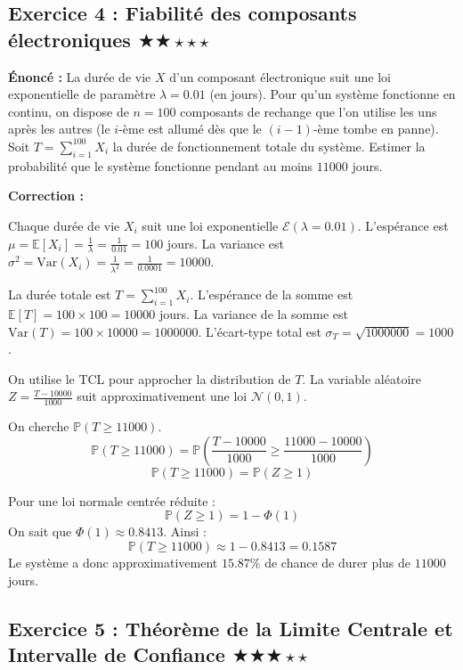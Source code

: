 \documentclass[11pt,a4paper]{article}
\begin{document}
\vspace{1cm}
\subsection*{Exercice 4 : Fiabilité des composants électroniques \quad $\bigstar\bigstar\star\star\star$}

\textbf{Énoncé :}
La durée de vie $X$ d'un composant électronique suit une loi exponentielle de paramètre $\lambda = 0.01$ (en jours).
Pour qu'un système fonctionne en continu, on dispose de $n=100$ composants de rechange que l'on utilise les uns après les autres (le $i$-ème est allumé dès que le $(i-1)$-ème tombe en panne).
Soit $T = \sum_{i=1}^{100} X_i$ la durée de fonctionnement totale du système.
Estimer la probabilité que le système fonctionne pendant au moins $11000$ jours.

\textbf{Correction :}

Chaque durée de vie $X_i$ suit une loi exponentielle $\mathcal{E}(\lambda = 0.01)$.
L'espérance est $\mu = \mathbb{E}[X_i] = \frac{1}{\lambda} = \frac{1}{0.01} = 100$ jours.
La variance est $\sigma^2 = \text{Var}(X_i) = \frac{1}{\lambda^2} = \frac{1}{0.0001} = 10000$.

La durée totale est $T = \sum_{i=1}^{100} X_i$.
L'espérance de la somme est $\mathbb{E}[T] = 100 \times 100 = 10000$ jours.
La variance de la somme est $\text{Var}(T) = 100 \times 10000 = 1000000$.
L'écart-type total est $\sigma_T = \sqrt{1000000} = 1000$.

On utilise le TCL pour approcher la distribution de $T$. La variable aléatoire $Z = \frac{T - 10000}{1000}$ suit approximativement une loi $\mathcal{N}(0, 1)$.

On cherche $\mathbb{P}(T \ge 11000)$.
$$\mathbb{P}(T \ge 11000) = \mathbb{P}\left( \frac{T - 10000}{1000} \ge \frac{11000 - 10000}{1000} \right)$$
$$\mathbb{P}(T \ge 11000) = \mathbb{P}(Z \ge 1)$$

Pour une loi normale centrée réduite :
$$\mathbb{P}(Z \ge 1) = 1 - \Phi(1)$$
On sait que $\Phi(1) \approx 0.8413$.
Ainsi :
$$\mathbb{P}(T \ge 11000) \approx 1 - 0.8413 = 0.1587$$
Le système a donc approximativement $15.87\%$ de chance de durer plus de $11000$ jours.


\vspace{1cm}
\subsection*{Exercice 5 : Théorème de la Limite Centrale et Intervalle de Confiance \quad $\bigstar\bigstar\bigstar\star\star$}
\end{document}
